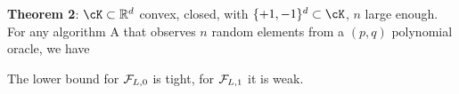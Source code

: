 \documentclass[portrait,a0paper,fontscale=0.285]{baposter} %
\begin{document}
\begin{poster}
{\textbf{Theorem 2}: 
$\cK\subset \R^d$ convex, closed, with  $\{+1,-1\}^d\subset \cK$, $n$ large enough.
For any algorithm $\mathrm{A}$ that observes $n$ random elements from a  $(p,q)$ polynomial oracle, we have
\begin{center}
\end{center}

The lower bound for ${\mathcal F}_{L,0}$ is tight, for ${\mathcal F}_{L,1}$ it is weak.

}

\end{poster}
\end{document}
